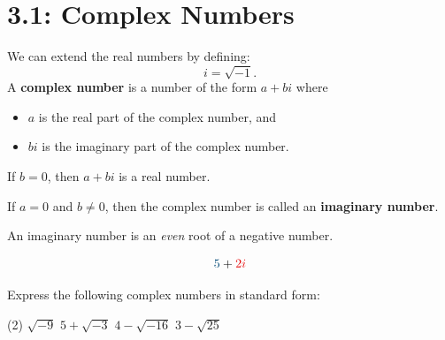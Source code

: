 \documentclass[../mathNotesPreamble]{subfiles}
\providecommand{\relscalefact}{1.4}
\begin{document}
\relscale{\relscalefact}
  \section{3.1: Complex Numbers}

  \begin{defn*}
    We can extend the real numbers by defining:
      \[i=\sqrt{-1}.\]
    A \textbf{complex number} is a number of the form $a+bi$ where
    \begin{itemize}
      \item $a$ is the real part of the complex number, and
      \item $bi$ is the imaginary part of the complex number.
    \end{itemize}
    If $b=0$, then $a+bi$ is a real number.

    If $a=0$ and $b\neq 0$, then the complex number is called an \textbf{imaginary number}.

    An imaginary number is an \emph{even} root of a negative number.
  \end{defn*}

  \tikzset{external/export=false}
  \newcommand{\tikzmark}[3]{%
    \tikz[baseline=(#1.base), remember picture]%
    \node[inner sep=0pt, #3] (#1)%
    {\ensuremath{#2}};%
  }
  \begin{align*}
    \tikzmark{realPart}{5}{lander_blue}+\tikzmark{imagPart}{2i}{red!90!black}
  \end{align*}
  \vspace*{1.25\baselineskip}
  \tikzset{external/export=true}

  \begin{ex*}
    Express the following complex numbers in standard form:
    \begin{extasks}[after-item-skip=\stretch{1}](2)
      \task $\sqrt{-9}$
      \task $5+\sqrt{-3}$
      \task $4-\sqrt{-16}$
      \task $3-\sqrt{25}$
    \end{extasks}
  \end{ex*}
  \pagebreak
\end{document}
